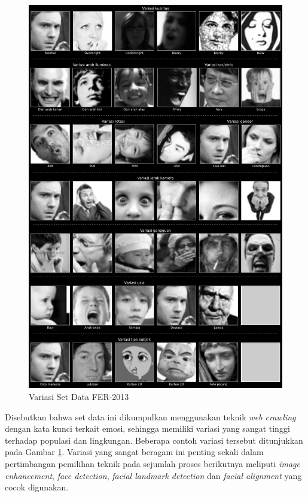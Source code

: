 \begin{figure}[htbp]
    \centering
    \includegraphics[width=13.7cm]{gambar/fer2013_variasi_all.png}
    \caption{Variasi Set Data FER-2013}
    \label{fig:variasifer2013}
\end{figure}
Disebutkan bahwa set data ini dikumpulkan menggunakan teknik \textit{web crawling} dengan kata kunci terkait emosi, sehingga memiliki variasi yang sangat tinggi terhadap populasi dan lingkungan. Beberapa contoh variasi tersebut ditunjukkan pada Gambar \ref{fig:variasifer2013}. Variasi yang sangat beragam ini penting sekali dalam pertimbangan pemilihan teknik pada sejumlah proses berikutnya meliputi \textit{image enhancement}, \textit{face detection}, \textit{facial landmark detection} dan \textit{facial alignment} yang cocok digunakan.

